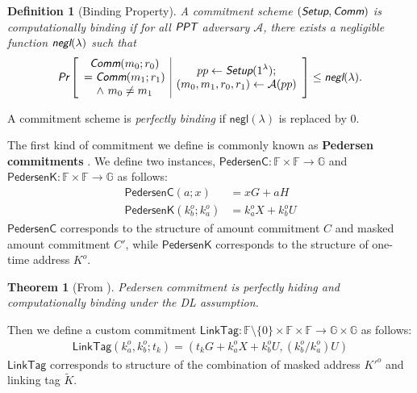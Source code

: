 \documentclass{article}
\theoremstyle{plain}
\newtheorem{definition}{Definition}[section]
\newtheorem{theorem}{Theorem}[section]
\theoremstyle{remark}
\begin{document}
\begin{definition}[Binding Property]
A commitment scheme $(\emph{\textsf{Setup}}, \emph{\textsf{Comm}})$ is computationally binding if for all $\emph{\textsf{PPT}}$ adversary $\mathcal{A}$, there exists a negligible function $\emph{\textsf{negl}}(\lambda)$ such that
\begin{align*}
\emph{\textsf{Pr}}
\left[
\begin{array}{c|c}
    \begin{gathered}
         \emph{\textsf{Comm}}(m_0;r_0) \\
        = \emph{\textsf{Comm}}(m_1;r_1) \\
        \wedge\ m_0 \ne m_1
    \end{gathered}
    &
    \begin{gathered}
        pp\leftarrow\emph{\textsf{Setup}}(1^{\lambda}); \\
        (m_0,m_1,r_0,r_1)\leftarrow\mathcal{A}(pp)
    \end{gathered}
\end{array}
\right]
\le \emph{\textsf{negl}}(\lambda).
\end{align*}
\end{definition}
A commitment scheme is \textit{perfectly binding} if $\textsf{negl}(\lambda)$ is replaced by $0$.

\noindent The first kind of commitment we define is commonly known as \textbf{Pedersen commitments} \cite{pedersen}. We define two instances, $\textsf{PedersenC}:\mathbb{F}\times\mathbb{F}\rightarrow\mathbb{G}$ and $\textsf{PedersenK}:\mathbb{F}\times\mathbb{F}\rightarrow\mathbb{G}$ as follows:
\begin{align*}
\textsf{PedersenC}(a; x) &= x G + a H \\
\textsf{PedersenK}(k_b^o;k_a^o) &= k_a^o X + k_b^o U
\end{align*}
$\textsf{PedersenC}$ corresponds to the structure of amount commitment $C$ and masked amount commitment $C'$, while $\textsf{PedersenK}$ corresponds to the structure of one-time address $K^o$.
\begin{theorem}[From \cite{pedersen}]\label{thm-pedersen}
Pedersen commitment is perfectly hiding and computationally binding under the DL assumption.
\end{theorem}

\noindent Then we define a custom commitment $\textsf{LinkTag}:\mathbb{F}\setminus\{0\}\times\mathbb{F}\times\mathbb{F}\rightarrow\mathbb{G}\times\mathbb{G}$ as follows:
\begin{align*}
\textsf{LinkTag}(k_a^o, k_b^o; t_k) = (t_k G + k_a^o X + k_b^o U, (k_b^o/k_a^o)U)
\end{align*}
$\textsf{LinkTag}$ corresponds to structure of the combination of masked address $K'^o$ and linking tag $\tilde{K}$.
\end{document}
